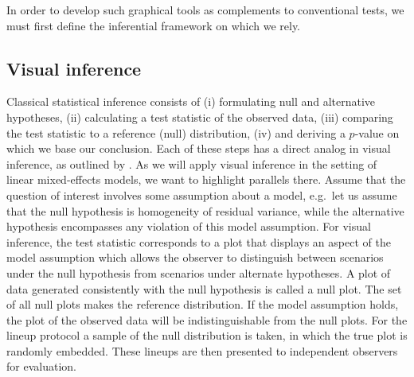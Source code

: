 \documentclass[12pt]{article} %
\newcommand{\hh}[1]{{\color{orange} #1}}
\newcommand{\alnote}[1]{\todo[inline,color=green!40]{#1}} %
\newcommand{\hhnote}[1]{\todo[inline,color=orange!40]{#1}}
\begin{document}
In order to develop such graphical tools as complements to conventional tests, we must first define the inferential framework on which we rely.

\subsection{Visual inference}\label{sec:vi}

Classical statistical inference consists of 
(i) formulating  null and alternative hypotheses,
	(ii) calculating a test statistic of the observed data,
	(iii) comparing the test statistic to a reference (null) distribution,
	(iv) and deriving a $p$-value on which we base our conclusion.
Each of these steps has a direct analog in visual inference, as outlined by \cite{Buja:2009hp}. As we will apply visual inference in the setting of linear mixed-effects models, we want to highlight  parallels there. Assume that  the question of interest involves  some assumption about a model, e.g.~let us assume that the null hypothesis is  homogeneity of residual variance,
while
the alternative hypothesis encompasses any violation of this model assumption. For visual inference, the test statistic corresponds to a plot  that displays an aspect of  the model assumption which allows the observer to distinguish between scenarios under the null hypothesis from scenarios under alternate hypotheses. 
A plot of data generated consistently with the null hypothesis is called a null plot. The set of all null plots makes the reference distribution. 
If the model assumption holds, the plot of the observed data will be indistinguishable from the null plots. 
For the lineup protocol a sample of the null distribution is taken, in which
the true plot is randomly embedded.  \hh{These lineups are then presented to independent observers for evaluation. }
\end{document}
